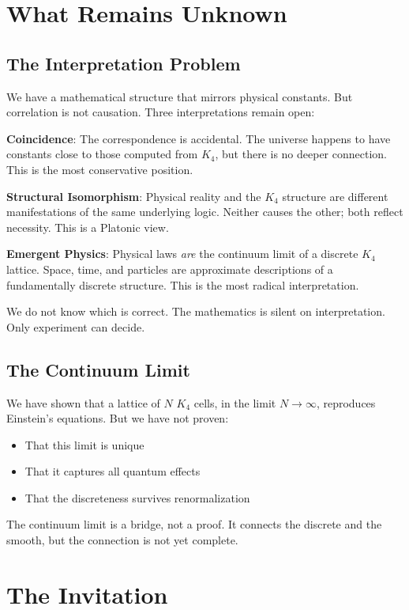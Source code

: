 \documentclass[11pt,a4paper]{book}
\begin{document}
\chapter{What Remains Unknown}

\section{The Interpretation Problem}

We have a mathematical structure that mirrors physical constants. But correlation is not causation. Three interpretations remain open:

\textbf{Coincidence}: The correspondence is accidental. The universe happens to have constants close to those computed from $K_4$, but there is no deeper connection. This is the most conservative position.

\textbf{Structural Isomorphism}: Physical reality and the $K_4$ structure are different manifestations of the same underlying logic. Neither causes the other; both reflect necessity. This is a Platonic view.

\textbf{Emergent Physics}: Physical laws \emph{are} the continuum limit of a discrete $K_4$ lattice. Space, time, and particles are approximate descriptions of a fundamentally discrete structure. This is the most radical interpretation.

We do not know which is correct. The mathematics is silent on interpretation. Only experiment can decide.

\section{The Continuum Limit}

We have shown that a lattice of $N$ $K_4$ cells, in the limit $N \to \infty$, reproduces Einstein's equations. But we have not proven:
\begin{itemize}
\item That this limit is unique
\item That it captures all quantum effects
\item That the discreteness survives renormalization
\end{itemize}

The continuum limit is a bridge, not a proof. It connects the discrete and the smooth, but the connection is not yet complete.

\chapter{The Invitation}
\end{document}
